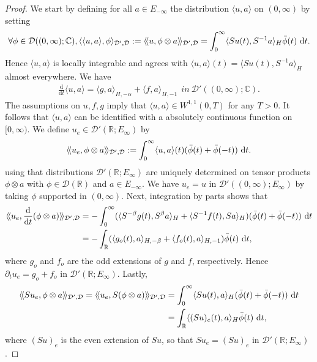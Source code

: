 \documentclass[11pt, letterpaper]{amsart}
\theoremstyle{definition}
\theoremstyle{remark}
\newcommand{\llangle}{\langle\!\langle}
\newcommand{\rrangle}{\rangle\!\rangle}
\numberwithin{equation}{section}
\begin{document}
{\begin{proof}
We start by defining for all $a \in E_{-\infty}$ the distribution $\langle u, a \rangle  $ on $(0,\infty)$ by setting
\begin{align*}
    \forall \phi \in \mathcal{D}((0,\infty);\mathbb{C}), \langle \langle u, a \rangle, \phi \rangle_{\mathcal{D}',\mathcal{D}}:= \llangle u, \phi \otimes a \rrangle_{\mathcal{D}',\mathcal{D}}= \int_0^\infty \langle Su(t), S^{-1}a \rangle_H \Bar{\phi}(t) \ \mathrm{d}t. 
\end{align*}
Hence $\langle u, a \rangle$ is locally integrable and agrees with  $\langle u, a \rangle(t)=\langle Su(t), S^{-1}a \rangle_H$ almost everywhere. We have 
\begin{align*}
    \frac{\mathrm{d} }{\mathrm{d} t} \langle u,a \rangle = \langle g,a \rangle_{H,-\alpha}+ \langle f,a \rangle_{H,-1} \ \  in \ \mathcal{D}'((0,\infty);\mathbb{C}).
\end{align*}
The assumptions on $u, f,g$ imply that    $  \langle u,a \rangle \in W^{1,1}(0,T)$ for any $T>0$. It follows that $\langle u,a \rangle$ can be identified with a absolutely continuous function on $[0,\infty)$. We define ${u_e} \in \mathcal{D}'(\mathbb{R};E_\infty)$ by 
\begin{align*}
    \llangle {u_e},\phi \otimes a \rrangle_{\mathcal{D}',\mathcal{D}} := \int_{0}^{\infty} \langle u,a \rangle (t) (\Bar{\phi}(t)+\Bar{\phi}(-t)) \ \mathrm{d}t.
\end{align*}
using that distributions $\mathcal{D}'(\mathbb{R};E_{\infty})$ are uniquely determined on tensor products $\phi \otimes a$ with $\phi \in \mathcal{D}(\mathbb{R})$ and $a \in E_{-\infty}$. We have ${u_e}=u$ in $\mathcal{D}'((0,\infty);E_\infty)$ by taking $\phi$ supported in $(0,\infty).$ Next, integration by parts shows that 
\begin{align*}
    \llangle {u_e},\frac{\mathrm{d}}{\mathrm{d}t}(\phi \otimes a) \rrangle_{\mathcal{D}',\mathcal{D}}&= -\int_{0}^{\infty} (\langle S^{-\beta}g(t),S^{\beta}a \rangle_H + \langle S^{-1}f(t),Sa \rangle_H)(\Bar{\phi}(t)+\Bar{\phi}(-t)) \ \mathrm{d}t
    \\ & = - \int_{\mathbb{R}} (\langle g_o(t),a \rangle_{H,-\beta} + \langle f_o(t),a \rangle_{H,-1}) \Bar{\phi}(t) \ \mathrm{d}t,
\end{align*}
where $g_o$ and $f_o$ are the odd extensions of $g$ and $f$, respectively. Hence $\partial_t {u_e} = g_o+f_o$ in $\mathcal{D}'(\mathbb{R};E_\infty).$ Lastly,
\begin{align*}
   \llangle S{u_e},\phi \otimes a \rrangle_{\mathcal{D}',\mathcal{D}}= \llangle {u_e},S(\phi \otimes a) \rrangle_{\mathcal{D}',\mathcal{D}} &= \int_{0}^{\infty} \langle Su(t),a \rangle_H (\Bar{\phi}(t)+\Bar{\phi}(-t)) \ \mathrm{d}t 
    \\ & = \int_{\mathbb{R}} \langle (Su)_e(t),a \rangle_H \Bar{\phi}(t) \ \mathrm d t,
\end{align*}
where $(Su)_e$ is the even extension of $Su$, so that $S{u_e}=(Su)_e$ in $\mathcal{D}'(\mathbb{R};E_\infty)$. 
\end{proof}




}
\end{document}
